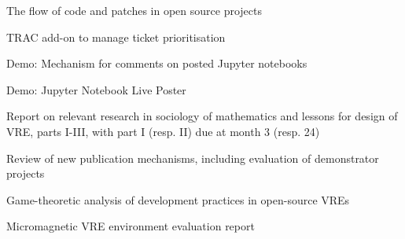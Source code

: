 \begin{workpackage}[id=social-aspects,wphases=0-48,
  title=Social Aspects,
  lead=UO,
  UORM=23,USHRM=18,USORM=6]
\begin{wpdelivs}
\begin{wpdeliv}[due=18,miles=proto1,id=social-datareport,dissem=PU,nature=R,lead=UO]
{The flow of code and patches in open source projects}
\end{wpdeliv}

\begin{wpdeliv}[due=24,miles=proto1,id=social-tracaddon,dissem=PU,nature=OTHER,lead=UO]
{TRAC add-on to manage ticket prioritisation}
\end{wpdeliv}

\begin{wpdeliv}[due=24,miles=proto1,id=jupyter-comment,dissem=PU,nature=DEM,lead=USH]
   {Demo: Mechanism for comments on posted Jupyter notebooks} 
\end{wpdeliv}

 \begin{wpdeliv}[due=36,miles=community,id=social-poster,dissem=PU,nature=DEM,lead=USH]
   {Demo: Jupyter Notebook Live Poster} 
\end{wpdeliv}

\begin{wpdeliv}[due=42,miles=eval,id=social-report-three,dissem=PU,nature=R,lead=UO]
 {Report on relevant research in sociology of mathematics and lessons
   for design of \TheProject VRE, parts I-III, with part I (resp. II) due at month 3 (resp. 24)}
\end{wpdeliv}
\begin{wpdeliv}[due=42,miles=eval,id=social-publishing-report,dissem=PU,nature=R,lead=USH]
{Review of new publication mechanisms, including evaluation of
  demonstrator projects}
\end{wpdeliv}

\begin{wpdeliv}[due=42,miles=eval,id=social-gametheoretic,dissem=PU,nature=R,lead=UO]
{Game-theoretic analysis of development practices in open-source VREs}
\end{wpdeliv}

 \begin{wpdeliv}[due=48,miles=eval,id=oommf-nb-evaluation,dissem=PU,nature=R,lead=USO]
      {Micromagnetic VRE environment evaluation report}
\end{wpdeliv}
\end{wpdelivs}
\end{workpackage}

